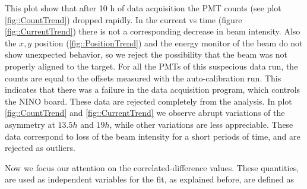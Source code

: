 This plot show that after 10 h of data acquisition the PMT counts (see plot \ref{fig::CountTrend}) dropped rapidly. In the current vs time (figure \ref{fig::CurrentTrend}) there is not a corresponding decrease in beam intensity. Also the $x,y$ position (\ref{fig::PositionTrend}) and the energy monitor of the beam do not show unexpected behavior, so we reject the possibility that the beam was not properly aligned to the target.
For all the PMTs of this suspecious data run, the counts are equal to the offsets measured with the auto-calibration run. 
This indicates that there was a failure in the data acquisition program, which controls the NINO board. These data are rejected completely from the analysis.
In plot \ref{fig::CountTrend} and \ref{fig::CurrentTrend} we observe abrupt variations of the asymmetry at $13.5 h$ and $19 h$, while other variations are less appreciable. These data correspond to loss of the beam intensity for a short periods of time, and are rejected as outliers. 

\begin{figure}[hbtp]
\centering
{}
\end{figure}

Now we focus our attention on the correlated-difference values. These quantities, are used as independent variables for the fit, as explained before, are defined as 

